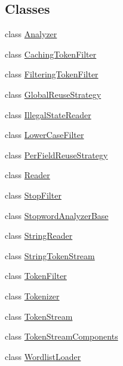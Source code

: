 \subsection*{Classes}
\begin{DoxyCompactItemize}
\item 
class \mbox{\hyperlink{classlucene_1_1core_1_1analysis_1_1Analyzer}{Analyzer}}
\item 
class \mbox{\hyperlink{classlucene_1_1core_1_1analysis_1_1CachingTokenFilter}{Caching\+Token\+Filter}}
\item 
class \mbox{\hyperlink{classlucene_1_1core_1_1analysis_1_1FilteringTokenFilter}{Filtering\+Token\+Filter}}
\item 
class \mbox{\hyperlink{classlucene_1_1core_1_1analysis_1_1GlobalReuseStrategy}{Global\+Reuse\+Strategy}}
\item 
class \mbox{\hyperlink{classlucene_1_1core_1_1analysis_1_1IllegalStateReader}{Illegal\+State\+Reader}}
\item 
class \mbox{\hyperlink{classlucene_1_1core_1_1analysis_1_1LowerCaseFilter}{Lower\+Case\+Filter}}
\item 
class \mbox{\hyperlink{classlucene_1_1core_1_1analysis_1_1PerFieldReuseStrategy}{Per\+Field\+Reuse\+Strategy}}
\item 
class \mbox{\hyperlink{classlucene_1_1core_1_1analysis_1_1Reader}{Reader}}
\item 
class \mbox{\hyperlink{classlucene_1_1core_1_1analysis_1_1StopFilter}{Stop\+Filter}}
\item 
class \mbox{\hyperlink{classlucene_1_1core_1_1analysis_1_1StopwordAnalyzerBase}{Stopword\+Analyzer\+Base}}
\item 
class \mbox{\hyperlink{classlucene_1_1core_1_1analysis_1_1StringReader}{String\+Reader}}
\item 
class \mbox{\hyperlink{classlucene_1_1core_1_1analysis_1_1StringTokenStream}{String\+Token\+Stream}}
\item 
class \mbox{\hyperlink{classlucene_1_1core_1_1analysis_1_1TokenFilter}{Token\+Filter}}
\item 
class \mbox{\hyperlink{classlucene_1_1core_1_1analysis_1_1Tokenizer}{Tokenizer}}
\item 
class \mbox{\hyperlink{classlucene_1_1core_1_1analysis_1_1TokenStream}{Token\+Stream}}
\item 
class \mbox{\hyperlink{classlucene_1_1core_1_1analysis_1_1TokenStreamComponents}{Token\+Stream\+Components}}
\item 
class \mbox{\hyperlink{classlucene_1_1core_1_1analysis_1_1WordlistLoader}{Wordlist\+Loader}}
\end{DoxyCompactItemize}
